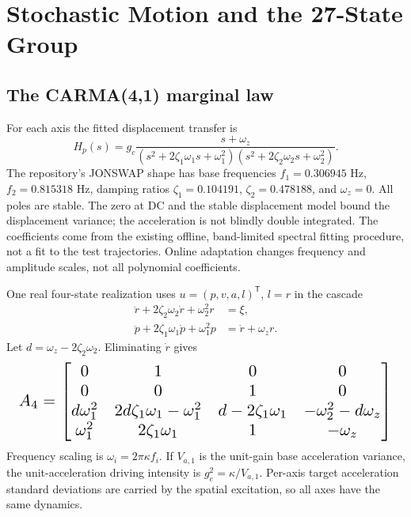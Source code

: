 \documentclass[conference]{IEEEtran}
\newcommand{\T}{^{\mathsf T}}\newcommand{\Hh}{^{\mathsf H}}
\begin{document}
\section{Stochastic Motion and the 27-State Group}
\subsection{The CARMA(4,1) marginal law}
For each axis the fitted displacement transfer is
\begin{equation}
 H_p(s)=g_c\frac{s+\omega_z}
 {(s^2+2\zeta_1\omega_1s+\omega_1^2)
  (s^2+2\zeta_2\omega_2s+\omega_2^2)} .
 \label{eq:transfer}
\end{equation}
The repository's JONSWAP shape has base frequencies
$f_1=0.306945$ Hz, $f_2=0.815318$ Hz, damping ratios
$\zeta_1=0.104191$, $\zeta_2=0.478188$, and $\omega_z=0$.
All poles are stable. The zero at DC and the stable displacement model bound
the displacement variance; the acceleration is not blindly double integrated.
The coefficients come from the existing offline, band-limited spectral fitting
procedure, not a fit to the test trajectories. Online adaptation changes
frequency and amplitude scales, not all polynomial coefficients.

One real four-state realization uses $u=(p,v,a,l)\T$, $l=r$ in the cascade
\begin{align}
 \ddot r+2\zeta_2\omega_2\dot r+\omega_2^2 r&=\xi,\\
 \ddot p+2\zeta_1\omega_1\dot p+\omega_1^2 p&=\dot r+\omega_z r.
\end{align}
Let $d=\omega_z-2\zeta_2\omega_2$. Eliminating $\dot r$ gives
\begin{equation}
 \resizebox{.98\columnwidth}{!}{$A_4=\begin{bmatrix}
 0&1&0&0\\0&0&1&0\\
 d\omega_1^2&2d\zeta_1\omega_1-\omega_1^2&d-2\zeta_1\omega_1&-\omega_2^2-d\omega_z\\
 \omega_1^2&2\zeta_1\omega_1&1&-\omega_z
 \end{bmatrix}$}
 \label{eq:a4}
\end{equation}
Frequency scaling is $\omega_i=2\pi\kappa f_i$. If $V_{a,1}$ is the
unit-gain base acceleration variance, the unit-acceleration driving intensity
is $g_c^2=\kappa/V_{a,1}$. Per-axis target acceleration standard deviations
are carried by the spatial excitation, so all axes have the same dynamics.
\end{document}
